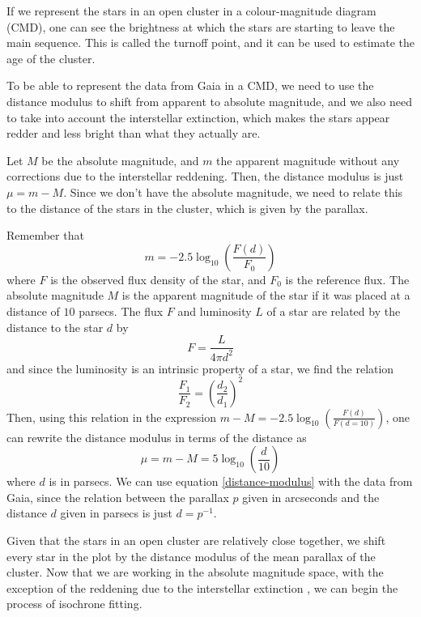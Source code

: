 \documentclass[twocolumn]{revtex4}
\begin{document}
If we represent the stars in an open cluster in a colour-magnitude diagram (CMD), one can see the brightness at which the stars are starting to leave the main sequence. This is called the turnoff point, and it can be used to estimate the age of the cluster.

To be able to represent the data from Gaia in a CMD, we need to use the distance modulus to shift from apparent to absolute magnitude, and we also need to take into account the interstellar extinction, which makes the stars appear redder and less bright than what they actually are.

Let $M$ be the absolute magnitude, and $m$ the apparent magnitude without any corrections due to the interstellar reddening. Then, the distance modulus is just $\mu = m - M$. Since we don't have the absolute magnitude, we need to relate this to the distance of the stars in the cluster, which is given by the parallax.

Remember that
\[m = -2.5 \log_{10} \left( \frac{F(d)}{F_0} \right) \]
where $F$ is the observed flux density of the star, and $F_0$ is the reference flux. %
The absolute magnitude $M$ is the apparent magnitude of the star if it was placed at a distance of $10$ parsecs. The flux $F$ and luminosity $L$ of a star are related by the distance to the star $d$ by
\[F = \frac{L}{4 \pi d^2}\]
and since the luminosity is an intrinsic property of a star, we find the relation
\begin{equation}
\frac{F_1}{F_2} = \left( \frac{d_2}{d_1} \right)^2
\end{equation}
Then, using this relation in the expression $m - M = -2.5 \log_{10} \left( \frac{F(d)}{F(d=10)} \right)$, one can rewrite the distance modulus in terms of the distance as
\begin{equation}
\label{distance-modulus}
\mu = m - M = 5 \log_{10} \left( \frac{d}{10} \right)
\end{equation}
where $d$ is in parsecs. We can use equation \ref{distance-modulus} with the data from Gaia, since the relation between the parallax $p$ given in arcseconds and the distance $d$ given in parsecs is just $d = p^{-1}$.

Given that the stars in an open cluster are relatively close together, we shift every star in the plot by the distance modulus of the mean parallax of the cluster. Now that we are working in the absolute magnitude space, with the exception of the reddening due to the interstellar extinction , we can begin the process of isochrone fitting.
\end{document}
